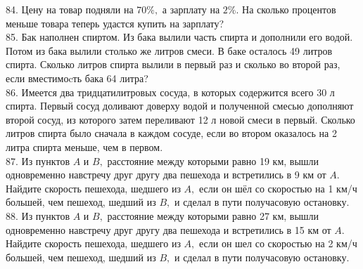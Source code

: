\documentclass[12pt]{article}
\begin{document}
84. Цену на товар подняли на $70\%,$ а зарплату на $2\%.$ На сколько процентов меньше товара теперь удастся купить на зарплату?\\
85. Бак наполнен спиртом. Из бака вылили часть спирта и
дополнили его водой. Потом из бака вылили столько же
литров смеси. В баке осталось 49 литров спирта. Сколько
литров спирта вылили в первый раз и сколько во второй
раз, если вместимоcть бака 64 литра?\\
86. Имеется два тридцатилитровых сосуда, в которых
содержится всего 30 л спирта. Первый сосуд доливают
доверху водой и полученной смесью дополняют второй
сосуд, из которого затем переливают 12 л новой смеси в
первый. Сколько литров спирта было сначала в каждом
сосуде, если во втором оказалось на 2 литра спирта
меньше, чем в первом.\\
87. Из пунктов $A$ и $B,$ расстояние между которыми равно 19
км, вышли одновременно навстречу друг другу два
пешехода и встретились в 9 км от $A.$ Найдите скорость
пешехода, шедшего из $A,$ если он шёл со скоростью на
1 км/ч большей, чем пешеход, шедший из $B,$ и сделал в
пути получасовую остановку.\\
88. Из пунктов $A$ и $B,$ расстояние между которыми равно 27
км, вышли одновременно навстречу друг другу два
пешехода и встретились в 15 км от $A.$ Найдите скорость
пешехода, шедшего из $A,$ если он шел со скоростью на
2 км/ч большей, чем пешеход, шедший из $B,$ и сделал в
пути получасовую остановку.
\newpage
\end{document}
